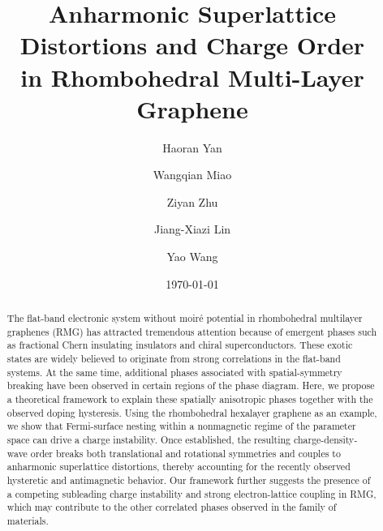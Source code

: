\documentclass[aps,prx,article,twocolumn,amsmath,amssymb,superscriptaddress,longbibliography]{revtex4-2}
\begin{document}
\title{Anharmonic Superlattice Distortions and Charge Order\\ in Rhombohedral Multi-Layer Graphene} 	
\author{Haoran Yan}
\author{Wangqian Miao}
\author{Ziyan Zhu}
\author{Jiang-Xiazi Lin}
\author{Yao Wang}
\date{\today}
\begin{abstract} 
The flat-band electronic system without moiré potential in rhombohedral multilayer graphenes (RMG) has attracted tremendous attention because of emergent phases such as fractional Chern insulating insulators and chiral superconductors. These exotic states are widely believed to originate from strong correlations in the flat-band systems. At the same time, additional phases associated with spatial-symmetry breaking have been observed in certain regions of the phase diagram. Here, we propose a theoretical framework to explain these spatially anisotropic phases together with the observed doping hysteresis. Using the rhombohedral hexalayer graphene as an example, we show that Fermi-surface nesting within a nonmagnetic regime of the parameter space can drive a charge instability. Once established, the resulting charge-density-wave order breaks both translational and rotational symmetries and couples to anharmonic superlattice distortions, thereby accounting for the recently observed hysteretic and antimagnetic behavior. Our framework further suggests the presence of a competing subleading charge instability and strong electron-lattice coupling in RMG, which may contribute to the other correlated phases observed in the family of materials.
\end{abstract}

\maketitle
\end{document}
